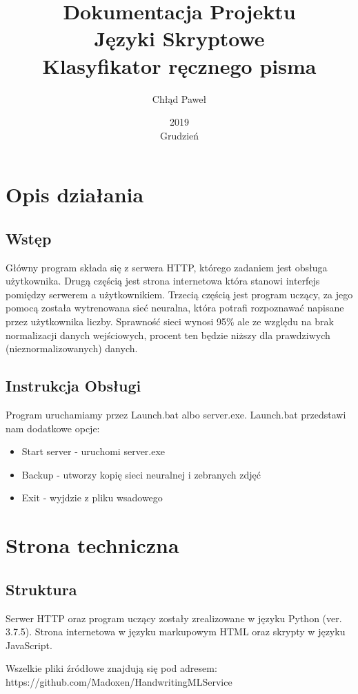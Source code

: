 \documentclass{article}
\title{Dokumentacja Projektu \\ Języki Skryptowe \\ Klasyfikator ręcznego pisma}
\author{Chłąd Paweł}
\date{2019 \\ Grudzień}
\begin{document}
\maketitle
\pagebreak
\section{Opis działania}

\subsection{Wstęp}
Główny program składa się z serwera HTTP, którego
zadaniem jest obsługa użytkownika. Drugą częścią jest 
strona internetowa która stanowi interfejs pomiędzy serwerem
a użytkownikiem. Trzecią częścią jest program uczący, za jego
pomocą została wytrenowana sieć neuralna, która potrafi rozpoznawać
napisane przez użytkownika liczby. Sprawność sieci wynosi 95\% ale 
ze względu na brak normalizacji danych wejściowych, procent ten będzie niższy
dla prawdziwych (nieznormalizowanych) danych. 

\subsection{Instrukcja Obsługi}

Program uruchamiamy przez Launch.bat albo server.exe. Launch.bat przedstawi nam dodatkowe opcje:
\begin{itemize}
    \item Start server - uruchomi server.exe
    \item Backup - utworzy kopię sieci neuralnej i zebranych zdjęć
    \item Exit - wyjdzie z pliku wsadowego
\end{itemize}




\section{Strona techniczna}
\subsection{Struktura}
Serwer HTTP oraz program uczący zostały zrealizowane w języku Python (ver. 3.7.5).
Strona internetowa w języku markupowym HTML oraz skrypty w języku JavaScript.

Wszelkie pliki źródłowe znajdują się pod adresem: https://github.com/Madoxen/HandwritingMLService
\end{document}
